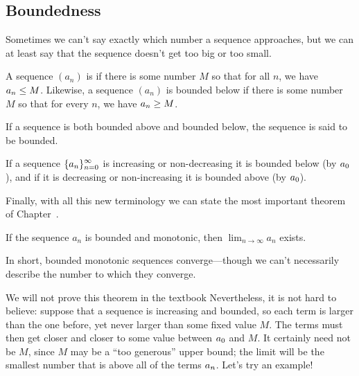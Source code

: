 \subsection{Boundedness}

Sometimes we can't say exactly which number a sequence approaches, but
we can at least say that the sequence doesn't get too big or too
small.

\begin{definition}
  A sequence $(a_n)$ is  if there is some number
$M$ so that for all $n$, we have $\displaystyle a_n\le M$.  Likewise, a sequence
$(a_n)$ is {\dfont bounded below\/} if
there is some number $M$ so that for every $n$, we have $\displaystyle a_n\ge M$.

If a sequence is both bounded above and bounded below, the sequence is said
to be {\dfont bounded\/}.
\end{definition}

If a sequence $\displaystyle
\{a_n\}_{n=0}^\infty$ is increasing or non-decreasing it is bounded
below (by $\displaystyle a_0$), and if it is decreasing or non-increasing it is
bounded above (by $\displaystyle a_0$).

Finally, with all this new terminology we can state the most important
theorem of Chapter~.

\begin{theorem} If the sequence $a_n$ is bounded and monotonic, then
  $\lim_{n \to \infty} a_n$ exists.  \label{thm:bounded-monotonic}
\end{theorem}
In short, bounded monotonic sequences converge---though we can't
necessarily describe the number to which they converge.

We will not prove this theorem in the textbook Nevertheless,
it is not hard to believe: suppose that a sequence is increasing and
bounded, so each term is larger than the one before, yet never larger
than some fixed value $M$. The terms must then get closer and closer
to some value between $\displaystyle a_0$ and $M$. It certainly need not be $M$,
since $M$ may be a ``too generous'' upper bound; the limit will be the
smallest number that is above all of the terms
$\displaystyle a_n$.  Let's try an example!

